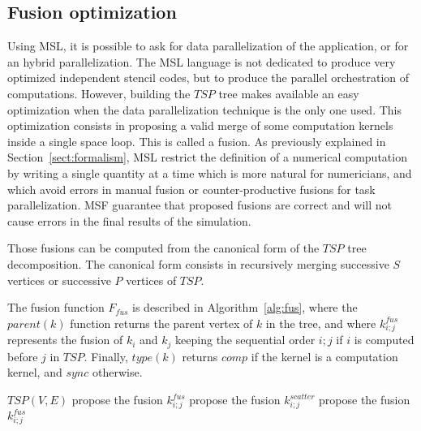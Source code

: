 \subsection{Fusion optimization}
\label{sect:fusion}

Using MSL, it is possible to ask for data parallelization of the application, or for an hybrid parallelization. The MSL language is not dedicated to produce very optimized independent stencil codes, but to produce the parallel orchestration of computations. However, building the $TSP$ tree makes available an easy optimization when the data parallelization technique is the only one used. 
This optimization consists in proposing a valid merge of some computation kernels inside a single space loop. This is called a fusion. As previously explained in Section~\ref{sect:formalism}, MSL restrict the definition of a numerical computation by writing a single quantity at a time which is more natural for numericians, and which avoid errors in manual fusion or counter-productive fusions for task parallelization. MSF guarantee that proposed fusions are correct and will not cause errors in the final results of the simulation.

Those fusions can be computed from the canonical form of the $TSP$ tree decomposition. The canonical form consists in recursively merging successive $S$ vertices or successive $P$ vertices of $TSP$.

The fusion function $F_{fus}$ is described in Algorithm~\ref{alg:fus}, where the $parent(k)$ function returns the parent vertex of $k$ in the tree, and where $k_{i;j}^{fus}$ represents the fusion of $k_i$ and $k_j$ keeping the sequential order $i;j$ if $i$ is computed before $j$ in $TSP$. Finally, $type(k)$ returns $comp$ if the kernel is a computation kernel, and $sync$ otherwise.

\begin{algorithm}
\caption{$F_{fus}$}
\label{alg:fus}
\begin{algorithmic}[1]
 {$TSP(V,E)$}
\State propose the fusion $k_{i;j}^{fus}$
\Else
{}
\State propose the fusion $k_{i;j}^{scatter}$
\EndIf
\EndIf
{}
\State propose the fusion $k_{i;j}^{fus}$
\EndIf
\EndIf
\EndIf
\EndIf
\EndFor
\EndProcedure
\end{algorithmic}
\end{algorithm}


